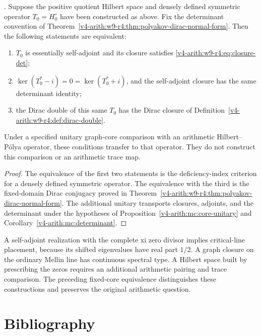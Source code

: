 \begin{theorem}
\label{v4-arith:w9-r4:thm:execution-result}
\ClaimStatusProvedHereConditional. Suppose the positive quotient
Hilbert space and densely defined symmetric operator
$T_0=H_0^\circ$ have been constructed as above.
Fix the determinant convention of
Theorem~\ref{v4-arith:w9-r4:thm:polyakov-dirac-normal-form}.
Then the following statements are equivalent:
\begin{enumerate}
\item $T_0$ is essentially self-adjoint and its closure satisfies
\eqref{v4-arith:w9-r4:eq:closure-det};
\item $\ker(T_0^*-i)=0=\ker(T_0^*+i)$, and the self-adjoint closure
has the same determinant identity;
\item the Dirac double of this same $T_0$ has the Dirac closure
of Definition~\ref{v4-arith:w9-r4:def:dirac-double}.
\end{enumerate}
Under a specified unitary graph-core comparison with an arithmetic
Hilbert--P\'olya operator, these conditions transfer to that operator.
They do not construct this comparison or an arithmetic trace map.
\end{theorem}
\begin{proof}
The equivalence of the first two statements is the deficiency-index
criterion for a densely defined symmetric operator.
The equivalence with the third is the fixed-domain Dirac
conjugacy proved in
Theorem~\ref{v4-arith:w9-r4:thm:polyakov-dirac-normal-form}.
The additional unitary transports closures, adjoints, and the
determinant under the hypotheses of
Proposition~\ref{v4-arith:mc:core-unitary} and
Corollary~\ref{v4-arith:mc:determinant}.
\end{proof}

\begin{remark}
\label{v4-arith:w9-r4:rem:failed-execution-record}
A self-adjoint realization with the complete xi zero divisor
implies critical-line placement, because its shifted eigenvalues
have real part $1/2$. A graph closure on the ordinary Mellin line
has continuous spectral type. A Hilbert space built by prescribing
the zeros requires an additional arithmetic pairing and trace
comparison. The preceding fixed-core equivalence distinguishes
these constructions and preserves the original arithmetic question.
\end{remark}

\section{Bibliography}
\label{v4-arith:w9-r4:biblio}

